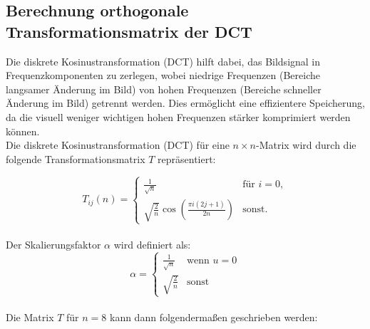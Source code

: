 \documentclass[12pt]{article}
\begin{document}
	\newpage
	
	\subsection{Berechnung orthogonale Transformationsmatrix der DCT}
		Die diskrete Kosinustransformation (DCT) hilft dabei, das Bildsignal in Frequenzkomponenten zu zerlegen, wobei niedrige Frequenzen (Bereiche langsamer Änderung im Bild) von hohen Frequenzen (Bereiche schneller Änderung im Bild) getrennt werden. Dies ermöglicht eine effizientere Speicherung, da die visuell weniger wichtigen hohen Frequenzen stärker komprimiert werden können.\\
		
		Die diskrete Kosinustransformation (DCT) für eine $n \times n$-Matrix wird durch die folgende Transformationsmatrix $T$ repräsentiert:
		\vspace{0.5cm}

		\[
		T_{ij}(n) = 
		\begin{cases} 
			\frac{1}{\sqrt{n}} & \text{für } i = 0, \\
			\sqrt{\frac{2}{n}} \cos\left(\frac{\pi i (2j+1)}{2n}\right) & \text{sonst}.
		\end{cases}
		\]
		\\
		 Der Skalierungsfaktor $\alpha$ wird definiert als:
		 	\[
		 \alpha = 
		 \begin{cases} 
		 	\frac{1}{\sqrt{n}} & \text{wenn } u = 0 \\
		 	\sqrt{\frac{2}{n}} & \text{sonst}
		 \end{cases}
		 \]
		\\
		Die Matrix $T$ für $n = 8$ kann dann folgendermaßen geschrieben werden:
\end{document}
